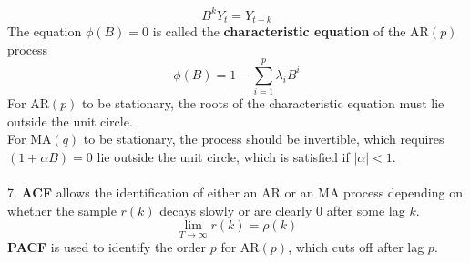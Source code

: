 \documentclass{article}
\begin{document}
\begin{enumerate}[S1 - ]
    \begin{equation*}
    B^kY_t = Y_{t-k}
    \end{equation*}
    The equation $\phi(B) = 0$ is called the \textbf{characteristic equation} of the AR$(p)$ process
    \begin{equation*}
    \phi(B) = 1 - \sum_{i=1}^{p}\lambda_iB^i
    \end{equation*}
    For AR$(p)$ to be stationary, the roots of the
    characteristic equation must lie outside the unit circle.\\
    For MA$(q)$ to be stationary, the process should be invertible, which requires $(1 + \alpha B) = 0$ lie outside the unit circle, which is satisfied if $|\alpha| < 1$.\\
    \\
    7. \textbf{ACF} allows the identification of either an AR or an MA process depending on whether the sample $r(k)$ decays slowly or are
    clearly 0 after some lag $k$.
    \begin{equation*}
    \lim_{T \to \infty} r(k) = \rho(k)
    \end{equation*}
    \textbf{PACF} is used to identify the order $p$ for AR$(p)$, which cuts off after lag $p$.\\
    

\end{enumerate}
\end{document}
